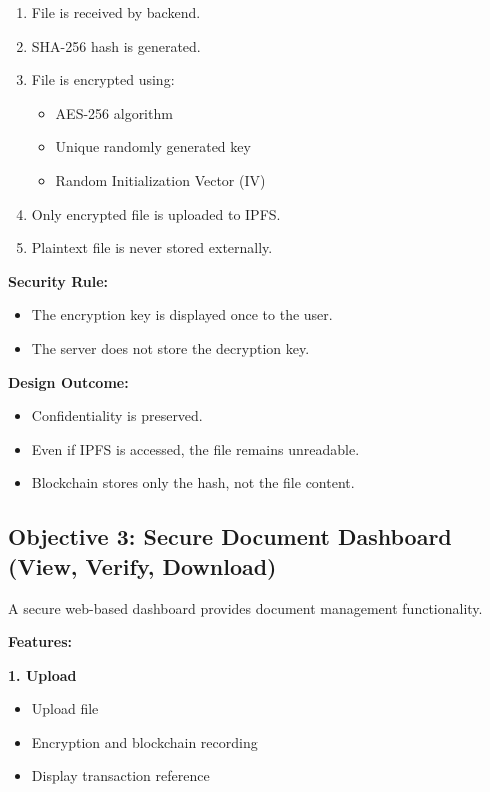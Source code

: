 \documentclass[12pt]{article}
\begin{document}
\begin{enumerate}
\item File is received by backend.
\item SHA-256 hash is generated.
\item File is encrypted using:
\begin{itemize}
\item AES-256 algorithm
\item Unique randomly generated key
\item Random Initialization Vector (IV)
\end{itemize}
\item Only encrypted file is uploaded to IPFS.
\item Plaintext file is never stored externally.
\end{enumerate}

\textbf{Security Rule:}

\begin{itemize}
\item The encryption key is displayed once to the user.
\item The server does not store the decryption key.
\end{itemize}

\textbf{Design Outcome:}

\begin{itemize}
\item Confidentiality is preserved.
\item Even if IPFS is accessed, the file remains unreadable.
\item Blockchain stores only the hash, not the file content.
\end{itemize}

\subsection{Objective 3: Secure Document Dashboard (View, Verify, Download)}

A secure web-based dashboard provides document management functionality.

\textbf{Features:}

\textbf{1. Upload}
\begin{itemize}
\item Upload file
\item Encryption and blockchain recording
\item Display transaction reference
\end{itemize}
\end{document}
